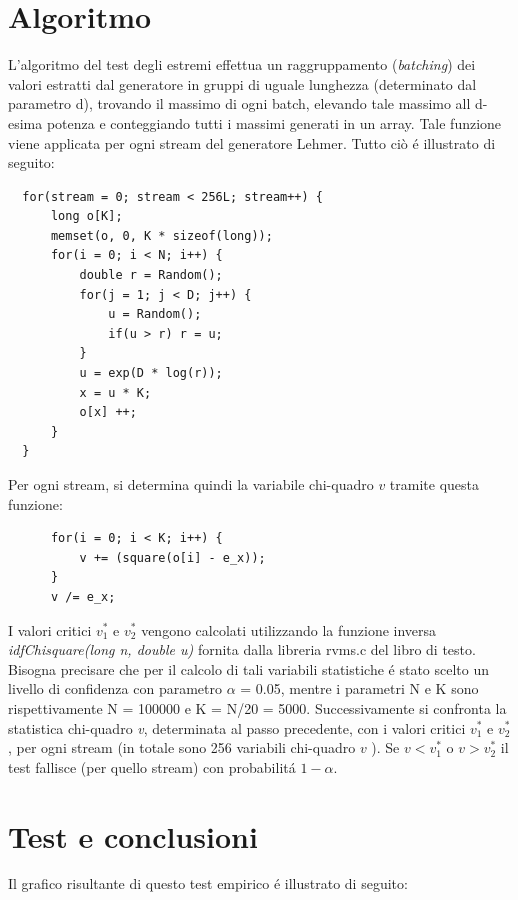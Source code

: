 \section{Algoritmo}
L'algoritmo del test degli estremi effettua un raggruppamento (\textit{batching}) dei 
valori estratti dal generatore in gruppi di uguale lunghezza (determinato dal 
parametro d), trovando il 
massimo di ogni batch, elevando tale massimo all d-esima potenza e conteggiando 
tutti i massimi generati in un array. Tale funzione viene applicata per ogni 
stream del generatore Lehmer.
Tutto ci\`o \'e illustrato di seguito:
\begin{verbatim}
  for(stream = 0; stream < 256L; stream++) {
      long o[K];
      memset(o, 0, K * sizeof(long));
      for(i = 0; i < N; i++) {
          double r = Random();
          for(j = 1; j < D; j++) {
              u = Random();
              if(u > r) r = u;
          }
          u = exp(D * log(r));
          x = u * K;
          o[x] ++;
      }
  }
\end{verbatim}
Per ogni stream, si determina quindi la variabile chi-quadro $v$ tramite questa 
funzione:
\begin{verbatim}
      for(i = 0; i < K; i++) {
	      v += (square(o[i] - e_x));
      }
      v /= e_x;
\end{verbatim}

I valori critici $v_1^{*}$ e $v_2^{*}$ vengono calcolati utilizzando la funzione inversa 
\textit{idfChisquare(long n, double u)}  fornita dalla libreria rvms.c del libro di 
testo. Bisogna precisare che per il calcolo 
di tali variabili statistiche \'e stato scelto un livello di confidenza con 
parametro $\alpha$ = 0.05, mentre i parametri N e K sono rispettivamente N = 100000 
e K = N/20 = 5000.
Successivamente si confronta la statistica chi-quadro \textit{v}, determinata al passo 
precedente, con i valori critici  $v_1^{*}$ e $v_2^{*}$ , per ogni stream (in totale sono 256 
variabili chi-quadro $v$ ).
Se $v < v_1^{*}$ o $v > v_2^{*}$ il test fallisce (per quello stream) con probabilit\'a $1 - 
\alpha$.

\section{Test e conclusioni}
\noindent Il grafico risultante di questo test empirico \'e illustrato di seguito:

